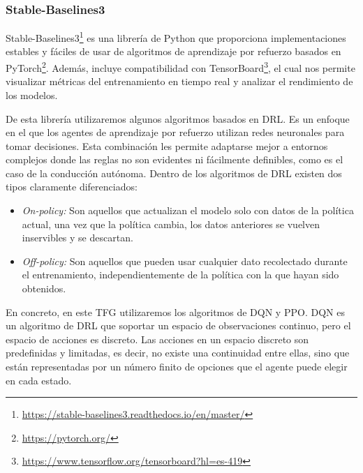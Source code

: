 \subsubsection{Stable-Baselines3}
\label{sec:stable_baselines3}

Stable-Baselines3\footnote{\url{https://stable-baselines3.readthedocs.io/en/master/}} es una librería de Python que proporciona implementaciones estables y fáciles de usar de algoritmos de aprendizaje por refuerzo basados en PyTorch\footnote{\url{https://pytorch.org/}}. Además, incluye compatibilidad con TensorBoard\footnote{\url{https://www.tensorflow.org/tensorboard?hl=es-419}}, el cual nos permite visualizar métricas del entrenamiento en tiempo real y analizar el rendimiento de los modelos. 

De esta librería utilizaremos algunos algoritmos basados en \ac{DRL}. Es un enfoque en el que los agentes de aprendizaje por refuerzo utilizan redes neuronales para tomar decisiones. Esta combinación les permite adaptarse mejor a entornos complejos donde las reglas no son evidentes ni fácilmente definibles, como es el caso de la conducción autónoma. Dentro de los algoritmos de \ac{DRL} existen dos tipos claramente diferenciados:

\begin{itemize}
\item \textit{On-policy:} Son aquellos que actualizan el modelo solo con datos de la política actual, una vez que la política cambia, los datos anteriores se vuelven inservibles y se descartan.
\item \textit{Off-policy:} Son aquellos que pueden usar cualquier dato recolectado durante el entrenamiento, independientemente de la política con la que hayan sido obtenidos.
\end{itemize}

En concreto, en este \ac{TFG} utilizaremos los algoritmos de \ac{DQN} y \ac{PPO}. \ac{DQN} es un algoritmo de \ac{DRL} que soportar un espacio de observaciones continuo, pero el espacio de acciones es discreto. Las acciones en un espacio discreto son predefinidas y limitadas, es decir, no existe una continuidad entre ellas, sino que están representadas por un número finito de opciones que el agente puede elegir en cada estado.

